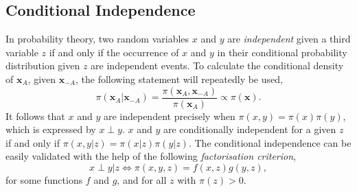\subsection{Conditional Independence}
In probability theory, two random variables $x$ and $y$ are \textit{independent} given a third variable $z$ if and only if the occurrence of $x$ and $y$ in their conditional probability distribution given $z$ are independent events. To calculate the conditional density of $\pmb{x}_A$, given $\pmb{x}_{-A}$, the following statement will repeatedly be used,
\begin{equation}
    \pi\left(\pmb{x}_A|\pmb{x}_{-A}\right)=\frac{\pi\left(\pmb{x}_A,\pmb{x}_{-A}\right)}{\pi\left(\pmb{x}_{A}\right)}\propto \pi\left(\pmb{x}\right).
\end{equation}
It follows that $x$ and $y$ are independent precisely when $\pi\left(x,y\right)=\pi\left(x\right)\pi\left(y\right)$, which is expressed by $x\perp y$. $x$ and $y$ are conditionally independent for a given $z$ if and only if $\pi\left(x,y|z\right)=\pi\left(x|z\right)\pi\left(y|z\right)$. The conditional independence can be easily validated with the help of the following \textit{factorisation criterion},
\begin{equation}
    x\perp y|z\Longleftrightarrow \pi\left(x,y,z\right)=f\left(x,z\right)g\left(y,z\right),
\end{equation}
for some functions $f$ and $g$, and for all $z$ with $\pi\left(z\right) >0$\autocite[Cf.][]{rue2005gaussian}.
